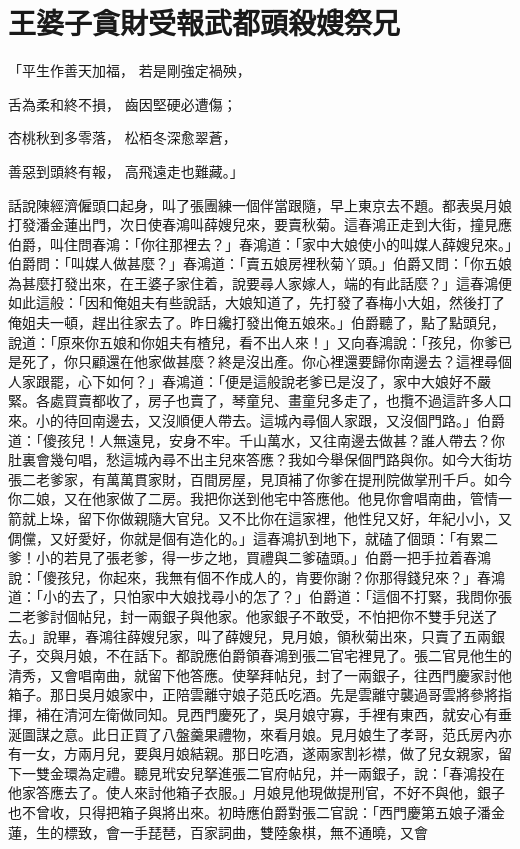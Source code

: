 %

\chapter{王婆子貪財受報\KG 武都頭殺嫂祭兄}

「平生作善天加福，  若是剛強定禍殃，

舌為柔和終不損，  齒因堅硬必遭傷；

杏桃秋到多零落，  松栢冬深愈翠蒼，

善惡到頭終有報，  高飛遠走也難藏。」

話說陳經濟僱頭口起身，叫了張團練一個伴當跟隨，早上東京去不題。都表吳月娘打發潘金蓮出門，次日使春鴻叫薛嫂兒來，要賣秋菊。這春鴻正走到大街，撞見應伯爵，叫住問春鴻：「你往那裡去？」春鴻道：「家中大娘使小的叫媒人薛嫂兒來。」伯爵問：「叫媒人做甚麼？」春鴻道：「賣五娘房裡秋菊丫頭。」伯爵又問：「你五娘為甚麼打發出來，在王婆子家住着，說要尋人家嫁人，端的有此話麼？」這春鴻便如此這般：「因和俺姐夫有些說話，大娘知道了，先打發了春梅小大姐，然後打了俺姐夫一頓，趕出往家去了。昨日纔打發出俺五娘來。」伯爵聽了，點了點頭兒，說道：「原來你五娘和你姐夫有楂兒，看不出人來！」又向春鴻說：「孩兒，你爹已是死了，你只顧還在他家做甚麼？終是沒出產。你心裡還要歸你南邊去？這裡尋個人家跟罷，心下如何？」春鴻道：「便是這般說老爹已是沒了，家中大娘好不嚴緊。各處買賣都收了，房子也賣了，琴童兒、畫童兒多走了，也攬不過這許多人口來。小的待回南邊去，又沒順便人帶去。這城內尋個人家跟，又沒個門路。」伯爵道：「傻孩兒！人無遠見，安身不牢。千山萬水，又往南邊去做甚？誰人帶去？你肚裏會幾句唱，愁這城內尋不出主兒來答應？我如今舉保個門路與你。如今大街坊張二老爹家，有萬萬貫家財，百間房屋，見頂補了你爹在提刑院做掌刑千戶。如今你二娘，又在他家做了二房。我把你送到他宅中答應他。他見你會唱南曲，管情一箭就上垛，留下你做親隨大官兒。又不比你在這家裡，他性兒又好，年紀小小，又倜儻，又好愛好，你就是個有造化的。」這春鴻扒到地下，就磕了個頭：「有累二爹！小的若見了張老爹，得一步之地，買禮與二爹磕頭。」伯爵一把手拉着春鴻說：「傻孩兒，你起來，我無有個不作成人的，肯要你謝？你那得錢兒來？」春鴻道：「小的去了，只怕家中大娘找尋小的怎了？」伯爵道：「這個不打緊，我問你張二老爹討個帖兒，封一兩銀子與他家。他家銀子不敢受，不怕把你不雙手兒送了去。」說畢，春鴻往薛嫂兒家，叫了薛嫂兒，見月娘，領秋菊出來，只賣了五兩銀子，交與月娘，不在話下。都說應伯爵領春鴻到張二官宅裡見了。張二官見他生的清秀，又會唱南曲，就留下他答應。使拏拜帖兒，封了一兩銀子，往西門慶家討他箱子。那日吳月娘家中，正陪雲離守娘子范氏吃酒。先是雲離守襲過哥雲將參將指揮，補在清河左衛做同知。見西門慶死了，吳月娘守寡，手裡有東西，就安心有垂涎圖謀之意。此日正買了八盤羹果禮物，來看月娘。見月娘生了孝哥，范氏房內亦有一女，方兩月兒，要與月娘結親。那日吃酒，遂兩家割衫襟，做了兒女親家，留下一雙金環為定禮。聽見玳安兒拏進張二官府帖兒，并一兩銀子，說：「春鴻投在他家答應去了。使人來討他箱子衣服。」月娘見他現做提刑官，不好不與他，銀子也不曾收，只得把箱子與將出來。初時應伯爵對張二官說：「西門慶第五娘子潘金蓮，生的標致，會一手琵琶，百家詞曲，雙陸象棋，無不通曉，又會